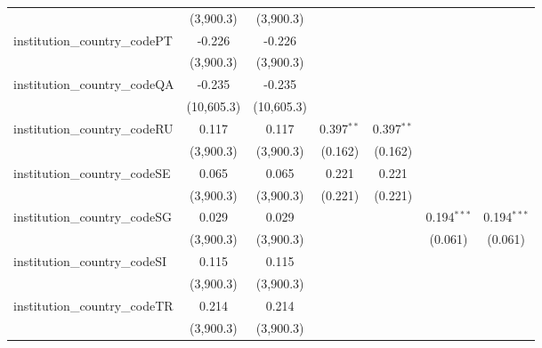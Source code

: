 \begin{tabular}{lcccccc}
                                         & (3,900.3)      & (3,900.3)      &               &               &                &   \\   
   institution\_country\_codePT          & -0.226         & -0.226         &               &               &                &   \\   
                                         & (3,900.3)      & (3,900.3)      &               &               &                &   \\   
   institution\_country\_codeQA          & -0.235         & -0.235         &               &               &                &   \\   
                                         & (10,605.3)     & (10,605.3)     &               &               &                &   \\   
   institution\_country\_codeRU          & 0.117          & 0.117          & 0.397$^{**}$  & 0.397$^{**}$  &                &   \\   
                                         & (3,900.3)      & (3,900.3)      & (0.162)       & (0.162)       &                &   \\   
   institution\_country\_codeSE          & 0.065          & 0.065          & 0.221         & 0.221         &                &   \\   
                                         & (3,900.3)      & (3,900.3)      & (0.221)       & (0.221)       &                &   \\   
   institution\_country\_codeSG          & 0.029          & 0.029          &               &               & 0.194$^{***}$  & 0.194$^{***}$\\   
                                         & (3,900.3)      & (3,900.3)      &               &               & (0.061)        & (0.061)\\   
   institution\_country\_codeSI          & 0.115          & 0.115          &               &               &                &   \\   
                                         & (3,900.3)      & (3,900.3)      &               &               &                &   \\   
   institution\_country\_codeTR          & 0.214          & 0.214          &               &               &                &   \\   
                                         & (3,900.3)      & (3,900.3)      &               &               &                &   \\   

\end{tabular}
